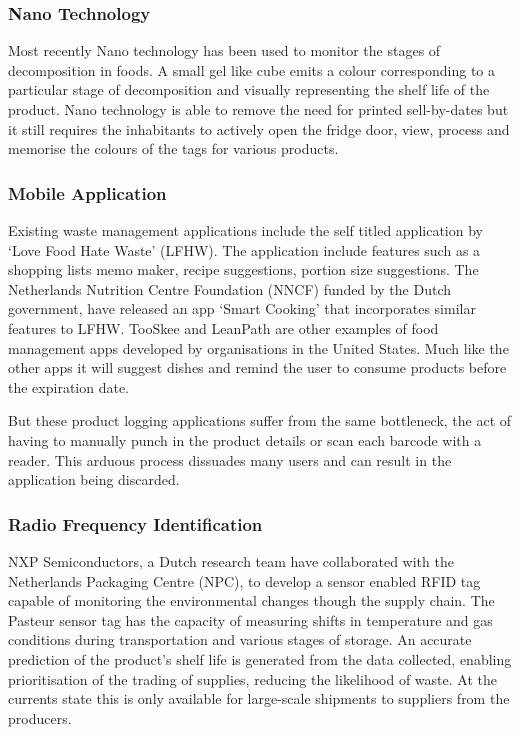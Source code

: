 \documentclass[a4paper, 11pt]{article}
\begin{document}
\subsubsection{Nano Technology} 
Most recently Nano technology has been used to monitor the stages of decomposition in foods. A small gel like cube emits a colour corresponding to a particular stage of decomposition and visually representing the shelf life of the product. Nano technology is able to remove the need for printed sell-by-dates but it still requires the inhabitants to actively open the fridge door, view, process and memorise the colours of the tags for various products.\cite{nano}

\subsubsection{Mobile Application} 
Existing waste management applications include the self titled application by `Love Food Hate Waste' (LFHW). The application include features such as a shopping lists memo maker, recipe suggestions, portion size suggestions. The Netherlands Nutrition Centre Foundation (NNCF) funded by the Dutch government, have released an app `Smart Cooking' that incorporates similar features to LFHW. TooSkee and LeanPath\cite{FoodWaste} are other examples of food management apps developed by organisations in the United States. Much like the other apps it will suggest dishes and remind the user to consume products before the expiration date.\cite{FoodWaste} 

But these product logging applications suffer from the same bottleneck, the act of having to manually punch in the product details or scan each barcode with a reader. This arduous process dissuades many users and can result in the application being discarded. 

\subsubsection{Radio Frequency Identification} 
NXP Semiconductors, a Dutch research team have collaborated with the Netherlands Packaging Centre (NPC),  to develop a sensor enabled RFID tag capable of monitoring the environmental changes though the supply chain. \cite{rfidFood} The Pasteur sensor tag has the capacity of measuring shifts in temperature and gas conditions during transportation and various stages of storage. An accurate prediction of the product's shelf life is generated from the data collected, enabling prioritisation of the trading of supplies, reducing the likelihood of waste. At the currents state this is only available for large-scale shipments to suppliers from the producers.
\end{document}
